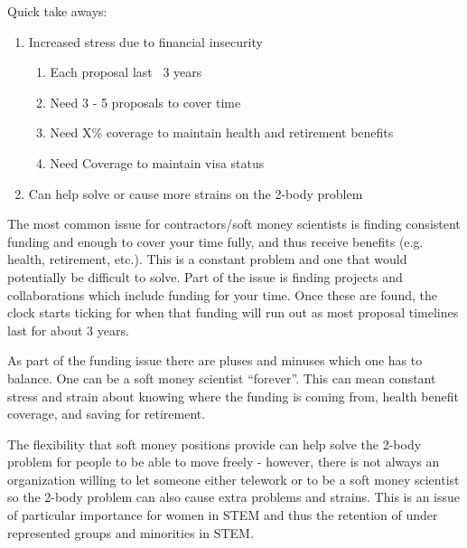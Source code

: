\documentclass[letterpaper, 12pt]{article}
\begin{document}
\begin{tcolorbox}[enhanced,width=\textwidth,center upper,
    fontupper=\bfseries,sharp corners, colback=CASIIlightgrey, colframe=CASIIdarkgreen]
\textcolor{CASIIorange}{Quick take aways:}
\begin{enumerate}

    \item \textcolor{CASIIdarkindago}{Increased stress due to financial insecurity
        \begin{enumerate}
            \item Each proposal last ~3 years		
            \item Need 3 - 5 proposals to cover time
            \item Need X\% coverage to maintain health and retirement benefits
            \item Need Coverage to maintain visa status
        \end{enumerate}}
    \item \textcolor{CASIIdarkindago}{Can help solve or cause more strains on the 2-body problem}

    
\end{enumerate}
\end{tcolorbox}


The most common issue for contractors/soft money scientists is finding consistent funding and enough to cover your time fully, and thus receive benefits (e.g. health, retirement, etc.). This is a constant problem and one that would potentially be difficult to solve. Part of the issue is finding projects and collaborations which include funding for your time. Once these are found, the clock starts ticking for when that funding will run out as most proposal timelines last for about 3 years. 

As part of the funding issue there are pluses and minuses which one has to balance. One can be a soft money scientist “forever”. This can mean constant stress and strain about knowing where the funding is coming from, health benefit coverage, and saving for retirement. 

The flexibility that soft money positions provide can help solve the 2-body problem for people to be able to move freely - however, there is not always an organization willing to let someone either telework or to be a soft money scientist so the 2-body problem can also cause extra problems and strains. This is an issue of particular importance for women in STEM and thus the retention of under represented groups and minorities in STEM. 
\end{document}
